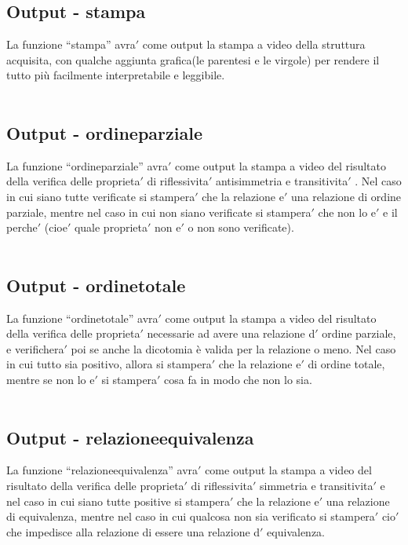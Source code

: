 \documentclass[11pt, a4paper, titlepage, block]{article}
\begin{document}
	\subsection{Output - stampa}
	La funzione “stampa” avra$'$  come output la stampa a video della struttura acquisita, con qualche aggiunta grafica(le parentesi e le virgole) per rendere il tutto più facilmente interpretabile e leggibile.\\
	\\
	\subsection{Output - ordine\textunderscore parziale}
	La funzione “ordine\textunderscore parziale” avra$'$  come output la stampa a video del risultato della verifica delle proprieta$'$  di riflessivita$'$  antisimmetria e transitivita$'$ . Nel caso in cui siano tutte verificate si stampera$'$  che la relazione e$'$  una relazione di ordine parziale, mentre nel caso in cui non siano verificate si stampera$'$  che non lo e$'$  e il perche$'$  (cioe$'$  quale proprieta$'$  non e$'$  o non sono verificate).\\
	\\
	\subsection{Output - ordine\textunderscore totale}
	La funzione “ordine\textunderscore totale” avra$'$  come output la stampa a video del risultato della verifica delle proprieta$'$  necessarie ad avere una relazione d$'$ ordine parziale, e verifichera$'$  poi se anche la dicotomia \`e valida per la relazione o meno. Nel caso in cui tutto sia positivo, allora si stampera$'$  che la relazione e$'$  di ordine totale, mentre se non lo e$'$  si stampera$'$  cosa fa in modo che non lo sia.\\
	\\
	\subsection{Output - relazione\textunderscore equivalenza}
	La funzione “relazione\textunderscore equivalenza” avra$'$  come output la stampa a video del risultato della verifica delle proprieta$'$  di riflessivita$'$  simmetria e transitivita$'$  e nel caso in cui siano tutte positive si stampera$'$  che la relazione e$'$  una relazione di equivalenza, mentre nel caso in cui qualcosa non sia verificato si stampera$'$  cio$'$  che impedisce alla relazione di essere una relazione d$'$ equivalenza.\\
	\\
\end{document}

